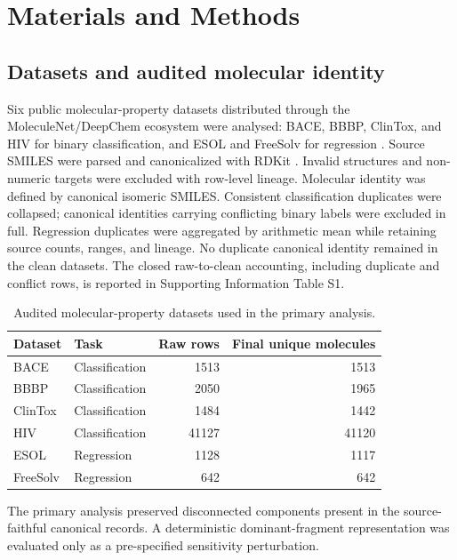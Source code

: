 \section{Materials and Methods}

\subsection{Datasets and audited molecular identity}

Six public molecular-property datasets distributed through the MoleculeNet/DeepChem ecosystem were analysed: BACE, BBBP, ClinTox, and HIV for binary classification, and ESOL and FreeSolv for regression \citep{wu2018moleculenet}. Source SMILES were parsed and canonicalized with RDKit \citep{rdkit}. Invalid structures and non-numeric targets were excluded with row-level lineage. Molecular identity was defined by canonical isomeric SMILES. Consistent classification duplicates were collapsed; canonical identities carrying conflicting binary labels were excluded in full. Regression duplicates were aggregated by arithmetic mean while retaining source counts, ranges, and lineage. No duplicate canonical identity remained in the clean datasets. The closed raw-to-clean accounting, including duplicate and conflict rows, is reported in Supporting Information Table S1.

\begin{table}[!htbp]
\centering
\caption{Audited molecular-property datasets used in the primary analysis.}
\label{tab:dataset-summary}
\begin{tabular}{llrr}
\toprule
Dataset & Task & Raw rows & Final unique molecules \\
\midrule
BACE & Classification & 1513 & 1513 \\
BBBP & Classification & 2050 & 1965 \\
ClinTox & Classification & 1484 & 1442 \\
HIV & Classification & 41127 & 41120 \\
ESOL & Regression & 1128 & 1117 \\
FreeSolv & Regression & 642 & 642 \\
\bottomrule
\end{tabular}
\end{table}

The primary analysis preserved disconnected components present in the source-faithful canonical records. A deterministic dominant-fragment representation was evaluated only as a pre-specified sensitivity perturbation.

